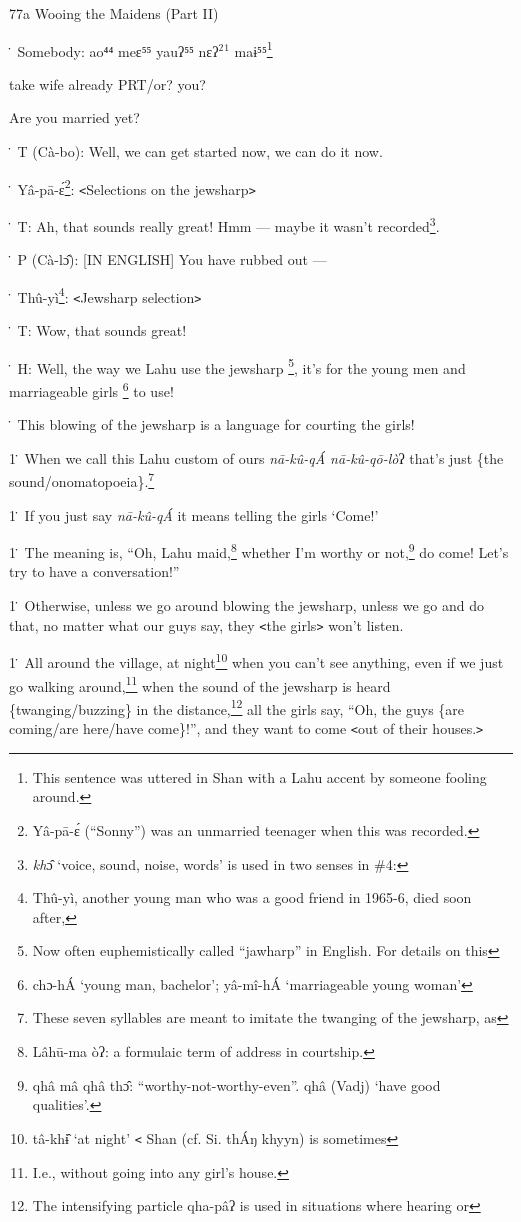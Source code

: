 
77a Wooing the Maidens (Part II)

\. Somebody:  ao⁴⁴ meɛ⁵⁵ yauʔ⁵⁵ nɛʔ\ensuremath{^2}\ensuremath{^1}  maɨ⁵⁵\footnote{This sentence was uttered in Shan with a Lahu accent by someone fooling around.}

take wife already PRT/or? you?

Are you married yet?

\. T (Cà-bo): Well, we can get started now, we can do it now.

\. Yâ-pā-ɛ́\footnote{Yâ-pā-ɛ́ (``Sonny'') was an unmarried teenager when this was recorded.}: \texttt{<}Selections on the jewsharp\texttt{>}

\. T: Ah, that sounds really great! Hmm --- maybe it wasn't recorded\footnote{\textit{kh}ɔ̂ `voice, sound, noise, words' is used in two senses in \#4:}.

\. P (Cà-lɔ̂): [IN ENGLISH] You have rubbed out ---

\. Thû-yì\footnote{Thû-yì, another young man who was a good friend in 1965-6, died soon after,}: \texttt{<}Jewsharp selection\texttt{>}

\. T: Wow, that sounds great!

\. H: Well, the way we Lahu use the jewsharp \footnote{Now often euphemistically called ``jawharp'' in English. For details on this}, it's for the young men and marriageable
girls \footnote{chɔ-hÁ `young man, bachelor'; yâ-mî-hÁ `marriageable young woman'} to use!

\. This blowing of the jewsharp is a language for courting the girls!

1\. When we call this Lahu custom of ours \textit{nā-kû-qÁ nā-kû-qō-lò}ʔ
that's just \{the sound/onomatopoeia\}.\footnote{These seven syllables are meant to imitate the twanging of the jewsharp, as}

1\. If you just say \textit{nā-kû-qÁ} it means telling the girls `Come!'

1\. The meaning is, ``Oh, Lahu maid,\footnote{Lâhū-ma òʔ: a formulaic term of address in courtship.} whether I'm worthy or not,\footnote{qhâ mâ qhâ thɔ̂: ``worthy-not-worthy-even''. qhâ (Vadj) `have good qualities'.} do come!
Let's try to have a conversation!''

1\. Otherwise, unless we go around blowing the jewsharp, unless we go and do that,
no matter what our guys say, they \texttt{<}the girls\texttt{>} won't listen.

1\. All around the village, at night\footnote{tâ-khɨ̂ `at night' \texttt{<} Shan (cf. Si. thÁŋ khyyn) is sometimes} when you can't see anything, even if we
just go walking around,\footnote{I.e., without going into any girl's house.} when the sound of the jewsharp is heard \{twanging/buzzing\}
in the distance,\footnote{The intensifying particle qha-pâʔ is used in situations where hearing or} all the girls say, ``Oh, the guys \{are coming/are here/have
come\}!'', and they want to come \texttt{<}out of their houses.\texttt{>}


